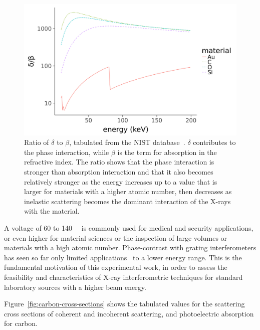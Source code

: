 \begin{figure}[htb]
    \centering
    \includegraphics[width=\textwidth]{gfx/delta-beta-comparison/delta-beta-comparison.png}
    \caption[Values of $\delta/\beta$ as a function of energy for different
    materials.]{Ratio of $\delta$ to $\beta$, tabulated from the NIST
        database~\parencite{nist}.
    $\delta$ contributes to the phase interaction, while $\beta$ is the term
    for absorption in the refractive index. The ratio shows that the phase
    interaction is stronger than absorption interaction and that it also
    becomes relatively stronger as the energy increases up to 
    a value that is larger for materials with a higher atomic number, then
    decreases as inelastic scattering becomes the dominant interaction of
the X-rays with the material.}
    \label{fig:delta.beta}
\end{figure}

A voltage of 60 to \SI{140}{\kilo\voltpeak} is commonly used for medical and
security applications, or even higher for material sciences or the
inspection of large volumes or materials with a high atomic number.
Phase-contrast with grating interferometers has seen so far only limited
applications~\parencite{Willner2013,Donath2009a} to a lower energy range.
This is the fundamental motivation of this experimental work, in order to
assess the feasibility and characteristics of X-ray interferometric
techniques for standard laboratory sources with a higher beam energy.

Figure~\ref{fig:carbon-cross-sections} shows the tabulated values for the
scattering cross sections of coherent and incoherent scattering, and
photoelectric absorption for carbon.

